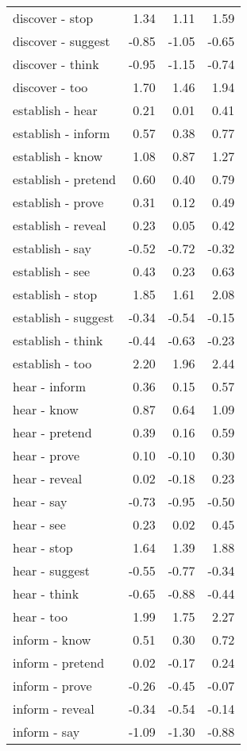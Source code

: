 \begin{longtable}{lrrr}
  discover - stop & 1.34 & 1.11 & 1.59 \\ 
  discover - suggest & -0.85 & -1.05 & -0.65 \\ 
  discover - think & -0.95 & -1.15 & -0.74 \\ 
  discover - too & 1.70 & 1.46 & 1.94 \\ 
  establish - hear & 0.21 & 0.01 & 0.41 \\ 
  establish - inform & 0.57 & 0.38 & 0.77 \\ 
  establish - know & 1.08 & 0.87 & 1.27 \\ 
  establish - pretend & 0.60 & 0.40 & 0.79 \\ 
  establish - prove & 0.31 & 0.12 & 0.49 \\ 
  establish - reveal & 0.23 & 0.05 & 0.42 \\ 
  establish - say & -0.52 & -0.72 & -0.32 \\ 
  establish - see & 0.43 & 0.23 & 0.63 \\ 
  establish - stop & 1.85 & 1.61 & 2.08 \\ 
  establish - suggest & -0.34 & -0.54 & -0.15 \\ 
  establish - think & -0.44 & -0.63 & -0.23 \\ 
  establish - too & 2.20 & 1.96 & 2.44 \\ 
  hear - inform & 0.36 & 0.15 & 0.57 \\ 
  hear - know & 0.87 & 0.64 & 1.09 \\ 
  hear - pretend & 0.39 & 0.16 & 0.59 \\ 
  hear - prove & 0.10 & -0.10 & 0.30 \\ 
  hear - reveal & 0.02 & -0.18 & 0.23 \\ 
  hear - say & -0.73 & -0.95 & -0.50 \\ 
  hear - see & 0.23 & 0.02 & 0.45 \\ 
  hear - stop & 1.64 & 1.39 & 1.88 \\ 
  hear - suggest & -0.55 & -0.77 & -0.34 \\ 
  hear - think & -0.65 & -0.88 & -0.44 \\ 
  hear - too & 1.99 & 1.75 & 2.27 \\ 
  inform - know & 0.51 & 0.30 & 0.72 \\ 
  inform - pretend & 0.02 & -0.17 & 0.24 \\ 
  inform - prove & -0.26 & -0.45 & -0.07 \\ 
  inform - reveal & -0.34 & -0.54 & -0.14 \\ 
  inform - say & -1.09 & -1.30 & -0.88 \\ 

\end{longtable}
